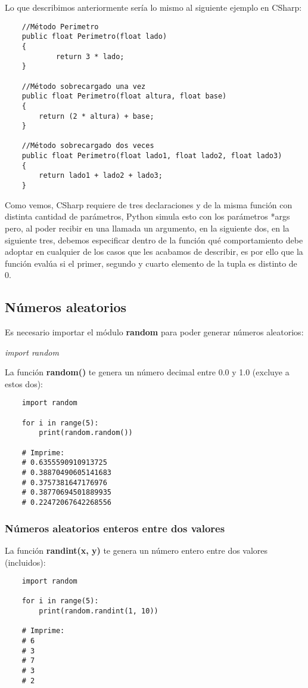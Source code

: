 Lo que describimos anteriormente sería lo mismo al siguiente ejemplo en CSharp:
\begin{lstlisting}
	//Método Perimetro
	public float Perimetro(float lado)
    {
    		return 3 * lado;
    }

    //Método sobrecargado una vez
    public float Perimetro(float altura, float base)
    {
        return (2 * altura) + base;
    }

    //Método sobrecargado dos veces
    public float Perimetro(float lado1, float lado2, float lado3)
    {
        return lado1 + lado2 + lado3;
    }
\end{lstlisting}

Como vemos, CSharp requiere de tres declaraciones y de la misma función con distinta cantidad de parámetros, Python simula esto con los parámetros *args pero, al poder recibir en una llamada un argumento, en la siguiente dos, en la siguiente tres, debemos especificar dentro de la función qué comportamiento debe adoptar en cualquier de los casos que les acabamos de describir, es por ello que la función evalúa si el primer, segundo y cuarto elemento de la tupla es distinto de 0.


\subsection{Números aleatorios}
\hspace{0.55cm}Es necesario importar el módulo \textbf{random} para poder generar números aleatorios:
\begin{center}
	\textit{import random}
\end{center}

La función \textbf{random()} te genera un número decimal entre 0.0 y 1.0 (excluye a estos dos):
\begin{lstlisting}
	import random

	for i in range(5):
		print(random.random())

	# Imprime:
	# 0.6355590910913725
	# 0.38870490605141683
	# 0.3757381647176976
	# 0.38770694501889935
	# 0.22472067642268556
\end{lstlisting}


\subsubsection{Números aleatorios enteros entre dos valores}
\hspace{0.55cm}La función \textbf{randint(x, y)} te genera un número entero entre dos valores (incluidos):
\begin{lstlisting}
	import random

	for i in range(5):
		print(random.randint(1, 10))

	# Imprime:
	# 6
	# 3
	# 7
	# 3
	# 2
\end{lstlisting}


